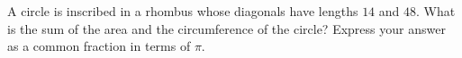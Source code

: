 A circle is inscribed in a rhombus whose diagonals have lengths $14$ and $48$. What is the sum of the area and the circumference of the circle? Express your answer as a common fraction in terms of $\pi$.
